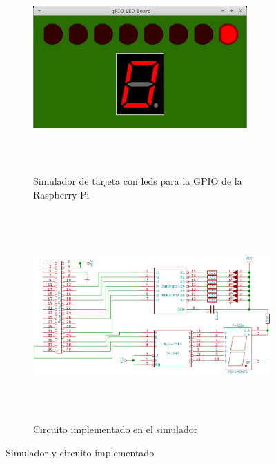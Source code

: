 \documentclass[letterpaper,10.5pt]{article}
\begin{document}
\begin{figure}[H]
	\centering%
	\begin{subfigure}{0.49\textwidth}
		\centering%
		\includegraphics[width=0.9\textwidth,height=8cm,keepaspectratio]{img/simboard.jpg} %
		\caption{Simulador de tarjeta con leds para la GPIO de la Raspberry Pi}
		\label{fig:simboard} %
	\end{subfigure}
	\hfill
	\begin{subfigure}{0.49\textwidth}
		\centering%
		\includegraphics[width=0.9\columnwidth,height=8cm,keepaspectratio]{img/diagram.pdf} %
		\caption{Circuito implementado en el simulador}
		\label{fig:wiring-diagram} %
	\end{subfigure}
	\caption{Simulador y circuito implementado}
	\label{fig:sim} %
\end{figure}

\end{document}
